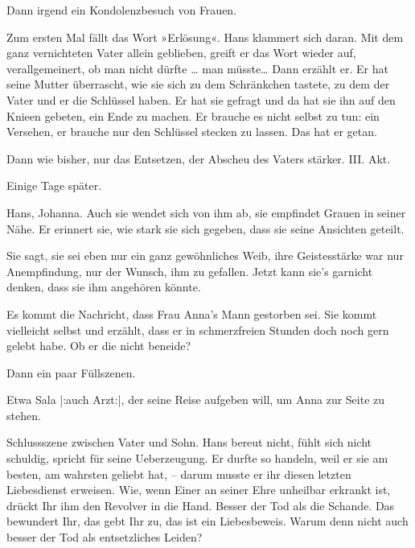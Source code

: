 \pstart
           Dann irgend ein Kondolenzbesuch von Frauen.\pend
           
\pstart
           Zum ersten Mal fällt das Wort »Erlösung«. Hans klammert sich daran. Mit dem ganz
               vernichteten Vater allein geblieben, greift er das Wort wieder auf, verallgemeinert,
               ob man nicht dürfte {\dots} man müsste{\dots} Dann erzählt er. Er hat seine Mutter überrascht, wie sie sich zu dem Schränkchen
               tastete, zu dem der Vater und er die Schlüssel haben. Er hat sie gefragt und da hat
               sie ihn auf den Knieen gebeten, ein Ende zu machen. Er brauche es nicht selbst zu
               tun: ein Versehen, er brauche nur den Schlüssel stecken zu lassen. Das hat er
               getan.\pend
           
\pstart
           Dann wie bisher, nur das Entsetzen, der Abscheu des Vaters stärker.\pend
           {\vspace{1\baselineskip}}
\pstart
           {\pb}III. Akt.\pend
           
\pstart
           Einige Tage später.\pend
           
\pstart
           Hans, Johanna. Auch sie wendet sich von ihm ab, sie empfindet Grauen in seiner Nähe.
               Er erinnert sie, wie stark sie sich gegeben, dass sie seine Ansichten geteilt.\pend
           
\pstart
           Sie sagt, sie sei eben nur ein ganz gewöhnliches Weib, ihre Geistesstärke war nur
               Anempfindung, nur der Wunsch, ihm zu gefallen. Jetzt kann sie’s garnicht denken, dass
               sie ihm angehören könnte.\pend
           
\pstart
           Es kommt die Nachricht, dass Frau Anna’s Mann gestorben sei. Sie kommt vielleicht
               selbst und erzählt, dass er in schmerzfreien Stunden doch noch gern gelebt habe. Ob
               er die nicht beneide?\pend
           
\pstart
           Dann ein paar Füllszenen.\pend
           
\pstart
           Etwa Sala |:auch Arzt:|, der seine Reise aufgeben will, um Anna zur Seite zu
               stehen.\pend
           
\pstart
           Schlussszene zwischen Vater und Sohn. Hans bereut nicht, fühlt sich nicht schuldig,
               spricht {\pb}für seine Ueberzeugung. Er durfte so
               handeln, weil er sie am besten, am wahrsten geliebt hat, – darum musste er ihr diesen
               letzten Liebesdienst erweisen. Wie, wenn Einer an seiner Ehre unheilbar erkrankt ist,
               drückt Ihr ihm den Revolver in die Hand. Besser der Tod als die Schande. Das
               bewundert Ihr, das gebt Ihr zu, das ist ein Liebesbeweis. Warum denn nicht auch
               besser der Tod als entsetzliches Leiden?\pend
           
